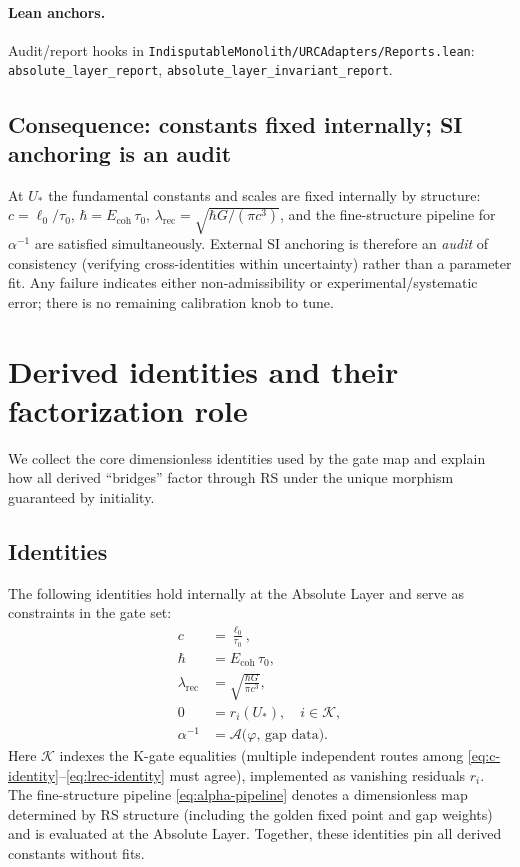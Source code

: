 \documentclass[11pt]{article}
\begin{document}

\paragraph{Lean anchors.} Audit/report hooks in \texttt{IndisputableMonolith/URCAdapters/Reports.lean}: \texttt{absolute\_layer\_report}, \texttt{absolute\_layer\_invariant\_report}.

\subsection{Consequence: constants fixed internally; SI anchoring is an audit}
At \(U_*\) the fundamental constants and scales are fixed internally by structure: \(c=\ell_0/\tau_0\), \(\hbar=E_{\mathrm{coh}}\,\tau_0\), \(\lambda_{\mathrm{rec}}=\sqrt{\hbar G/(\pi c^3)}\), and the fine\mbox{-}structure pipeline for \(\alpha^{-1}\) are satisfied simultaneously. External SI anchoring is therefore an \emph{audit} of consistency (verifying cross\mbox{-}identities within uncertainty) rather than a parameter fit. Any failure indicates either non\mbox{-}admissibility or experimental/systematic error; there is no remaining calibration knob to tune.

\section{Derived identities and their factorization role}
We collect the core dimensionless identities used by the gate map and explain how all derived ``bridges'' factor through RS under the unique morphism guaranteed by initiality.

\subsection{Identities}
The following identities hold internally at the Absolute Layer and serve as constraints in the gate set:
\begin{align}
  c &= \frac{\ell_0}{\tau_0}, \label{eq:c-identity} \\
  \hbar &= E_{\mathrm{coh}}\,\tau_0, \label{eq:hbar-identity} \\
  \lambda_{\mathrm{rec}} &= \sqrt{\frac{\hbar G}{\pi c^3}}, \label{eq:lrec-identity} \\
  0 &= r_i(U_*), \quad i\in\mathcal{K}, \label{eq:kgates-zero} \\
  \alpha^{-1} &= \mathcal{A}\bigl(\varphi,\,\text{gap data}\bigr). \label{eq:alpha-pipeline}
\end{align}
Here \(\mathcal{K}\) indexes the K\mbox{-}gate equalities (multiple independent routes among \eqref{eq:c-identity}--\eqref{eq:lrec-identity} must agree), implemented as vanishing residuals \(r_i\). The fine\mbox{-}structure pipeline \eqref{eq:alpha-pipeline} denotes a dimensionless map determined by RS structure (including the golden fixed point and gap weights) and is evaluated at the Absolute Layer. Together, these identities pin all derived constants without fits.
\end{document}
